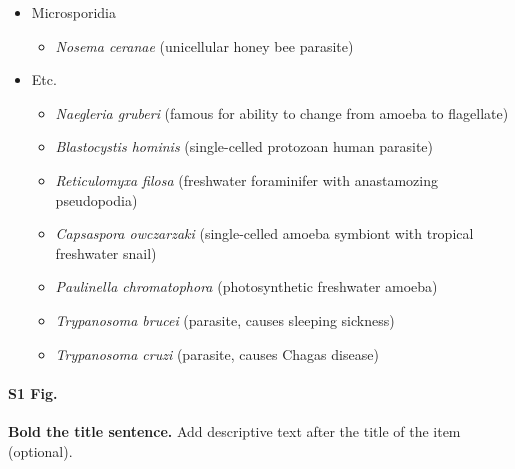 \documentclass[10pt,letterpaper]{article}
\begin{document}
\begin{itemize}
\begin{itemize}
			\item \textit{Guillardia theta} (flagellate cryptomonad algae)
			\item \textit{Salpingoeca rosetta} (choanoflagellate, closest living relatives of the animals)
			\item \textit{Leishmania infantum} (kinetoplastid protozoan with single flagellum)
			\item Diplomonads
			\begin{itemize}
				\item \textit{Giardia lamblia} (flagellated protozoan parasite)
			\end{itemize}
			\item Trichomonads
			\begin{itemize}
				\item \textit{Trichomonas vaginalis} (anaerobic, flagellated protozoan parasite)
			\end{itemize}
	\end{itemize}
	\item Microsporidia
	\begin{itemize}
		\item \textit{Nosema ceranae} (unicellular honey bee parasite)
	\end{itemize}
	\item Etc.
	\begin{itemize}
		\item \textit{Naegleria gruberi} (famous for ability to change from amoeba to flagellate)
		\item \textit{Blastocystis hominis} (single-celled protozoan human parasite)
		\item \textit{Reticulomyxa filosa} (freshwater foraminifer with anastamozing pseudopodia)
		\item \textit{Capsaspora owczarzaki} (single-celled amoeba symbiont with tropical freshwater snail)
		\item \textit{Paulinella chromatophora} (photosynthetic freshwater amoeba)
		\item \textit{Trypanosoma brucei} (parasite, causes sleeping sickness)
		\item \textit{Trypanosoma cruzi} (parasite, causes Chagas disease)
	\end{itemize}
\end{itemize}

\paragraph*{S1 Fig.}
\label{S1_Fig}
{\bf Bold the title sentence.} Add descriptive text after the title of the item (optional).
\end{document}
